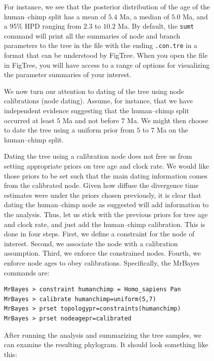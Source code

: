 \documentclass[12pt]{book}
\newcommand{\ttt}[1]{\texttt{#1}}
\begin{document}
\begin{figure}[h]
For instance, we see that the posterior distribution of the age of the human--chimp split has a
mean of $5.4$ Ma, a median of $5.0$ Ma, and a 95\% HPD ranging from $2.3$ to $10.2$ Ma. By default,
the \ttt{sumt} command will print all the summaries of node and branch parameters to the tree in
the file with the ending \ttt{.con.tre} in a format that can be understood by FigTree. When you
open the file in FigTree, you will have access to a range of options for visualizing the parameter
summaries of your interest.

We now turn our attention to dating of the tree using node calibrations (node dating). Assume, for
instance, that we have independent evidence suggesting that the human--chimp split occurred at
least $5$ Ma and not before $7$ Ma. We might then choose to date the tree using a uniform prior
from $5$ to $7$ Ma on the human--chimp split.

Dating the tree using a calibration node does not free us from setting appropriate priors on tree
age and clock rate. We would like those priors to be set such that the main dating information
comes from the calibrated node. Given how diffuse the divergence time estimates were under the
priors chosen previously, it is clear that dating the human--chimp node as suggested will add
information to the analysis. Thus, let us stick with the previous priors for tree age and clock
rate, and just add the human--chimp calibration. This is done in four steps. First, we define a
constraint for the node of interest. Second, we associate the node with a calibration assumption.
Third, we enforce the constrained nodes. Fourth, we enforce node ages to obey calibrations.
Specifically, the MrBayes commands are:

\begin{singlespacing}
\begin{verbatim}
MrBayes > constraint humanchimp = Homo_sapiens Pan
MrBayes > calibrate humanchimp=uniform(5,7)
MrBayes > prset topologypr=constraints(humanchimp)
MrBayes > prset nodeagepr=calibrated
\end{verbatim}
\end{singlespacing}

After running the analysis and summarizing the tree samples, we can examine the resulting
phylogram. It should look something like this:


\end{figure}
\end{document}
